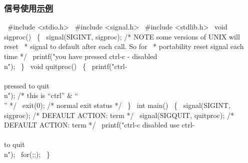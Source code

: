 % 
\begin{frame}[fragile]
    \frametitle{信号使用\href{https://stackoverflow.com/questions/4217037/catch-ctrl-c-in-c}{示例}}
\tiny
\begin{semiverbatim}
\ #include <stdio.h>
\ #include <signal.h>
\ #include <stdlib.h>
\ void sigproc()
\ \{       
\     signal(SIGINT, sigproc);   /* NOTE some versions of UNIX will reset 
\                 * signal to default after each call. So for 
\                 * portability reset signal each time */
\     printf("you have pressed ctrl-c - disabled \\n");
\ \}
\ void quitproc()
\ \{        
\     printf("ctrl-\\\\ pressed to quit\\n");   /* this is “ctrl” \& “\\” */
\     exit(0); /* normal exit status */
\ \}
\ int main()
\ \{ 
\     signal(SIGINT, sigproc);    /* DEFAULT ACTION: term */
\     signal(SIGQUIT, quitproc);  /* DEFAULT ACTION: term */
\     printf("ctrl-c disabled use ctrl-\\\\ to quit\\n");
\     for(;;);
\ \}
\end{semiverbatim}

\end{frame}
